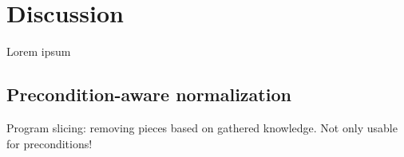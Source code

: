 \chapter{Discussion}
\label{sec:discussion}

Lorem ipsum







\section{Precondition-aware normalization}
\label{sec:discussion-preconditions}

Program slicing: removing pieces based on gathered knowledge. Not only usable for preconditions!
